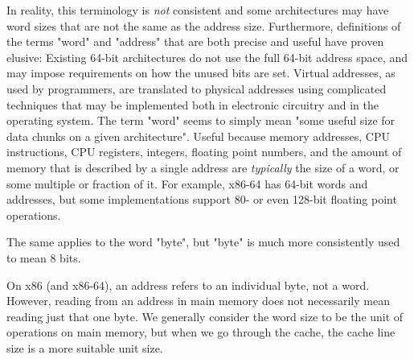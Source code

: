 In reality, this terminology is \textit{not} consistent and some architectures may
have word sizes that are not the same as the address size. Furthermore,
definitions of the terms "word" and "address" that are both precise and useful
have proven elusive: Existing 64-bit architectures do not use the full 64-bit
address space, and may impose requirements on how the unused bits are set.
Virtual addresses, as used by programmers, are translated to physical addresses
using complicated techniques that may be implemented both in electronic
circuitry and in the operating system. The term "word" seems to simply mean
"some useful size for data chunks on a given architecture". Useful because
memory addresses, CPU instructions, CPU registers, integers, floating point
numbers, and the amount of memory that is described by a single address are
\textit{typically} the size of a word, or some multiple or fraction of it. For
example, x86-64 has 64-bit words and addresses, but some implementations support
80- or even 128-bit floating point operations.

The same applies to the word "byte", but "byte" is much more consistently used
to mean 8 bits.

On x86 (and x86-64), an address refers to an individual byte, not a word. However,
reading from an address in main memory does not necessarily mean reading just
that one byte. We generally consider the word size to be the unit of operations
on main memory, but when we go through the cache, the cache line size is a more
suitable unit size.
